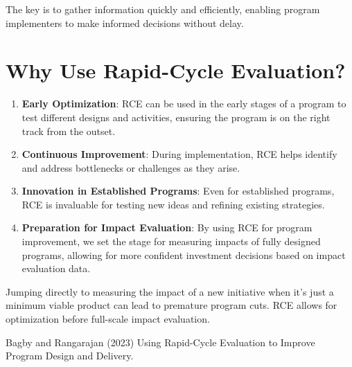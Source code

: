 \documentclass[
  letterpaper,
  DIV=11,
  numbers=noendperiod]{scrreprt}
\begin{document}
The key is to gather information quickly and efficiently, enabling
program implementers to make informed decisions without delay.

\section{Why Use Rapid-Cycle
Evaluation?}\label{why-use-rapid-cycle-evaluation}

\begin{enumerate}
\def\labelenumi{\arabic{enumi}.}
\item
  \textbf{Early Optimization}: RCE can be used in the early stages of a
  program to test different designs and activities, ensuring the program
  is on the right track from the outset.
\item
  \textbf{Continuous Improvement}: During implementation, RCE helps
  identify and address bottlenecks or challenges as they arise.
\item
  \textbf{Innovation in Established Programs}: Even for established
  programs, RCE is invaluable for testing new ideas and refining
  existing strategies.
\item
  \textbf{Preparation for Impact Evaluation}: By using RCE for program
  improvement, we set the stage for measuring impacts of fully designed
  programs, allowing for more confident investment decisions based on
  impact evaluation data.
\end{enumerate}

\begin{tcolorbox}[enhanced jigsaw, colframe=quarto-callout-warning-color-frame, left=2mm, toprule=.15mm, colbacktitle=quarto-callout-warning-color!10!white, title=\textcolor{quarto-callout-warning-color}{\faExclamationTriangle}\hspace{0.5em}{Warning}, coltitle=black, rightrule=.15mm, leftrule=.75mm, colback=white, arc=.35mm, bottomtitle=1mm, bottomrule=.15mm, breakable, titlerule=0mm, opacitybacktitle=0.6, toptitle=1mm, opacityback=0]

Jumping directly to measuring the impact of a new initiative when it's
just a minimum viable product can lead to premature program cuts. RCE
allows for optimization before full-scale impact evaluation.

\end{tcolorbox}

\begin{tcolorbox}[enhanced jigsaw, colframe=quarto-callout-tip-color-frame, left=2mm, toprule=.15mm, colbacktitle=quarto-callout-tip-color!10!white, title=\textcolor{quarto-callout-tip-color}{\faLightbulb}\hspace{0.5em}{Learn more}, coltitle=black, rightrule=.15mm, leftrule=.75mm, colback=white, arc=.35mm, bottomtitle=1mm, bottomrule=.15mm, breakable, titlerule=0mm, opacitybacktitle=0.6, toptitle=1mm, opacityback=0]

Bagby and Rangarajan (2023) Using Rapid-Cycle Evaluation to Improve
Program Design and Delivery.

\end{tcolorbox}
\end{document}

